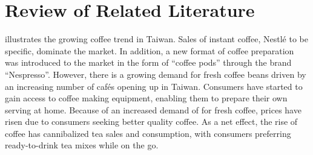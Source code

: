 \section{Review of Related Literature}

\autocite{euromonitor_international_coffee_2015} illustrates the growing coffee
trend in Taiwan. Sales of instant coffee, Nestlé to be specific, dominate the
market. In addition, a new format of coffee preparation was introduced to the
market in the form of ``coffee pods'' through the brand ``Nespresso''. However,
there is a growing demand for fresh coffee beans driven by an increasing number
of cafés opening up in Taiwan. Consumers have started to gain access to coffee
making equipment, enabling them to prepare their own serving at home. Because of
an increased demand of for fresh coffee, prices have risen due to consumers
seeking better quality coffee. As a net effect, the rise of coffee has
cannibalized tea sales and consumption, with consumers preferring ready-to-drink
tea mixes while on the go.
